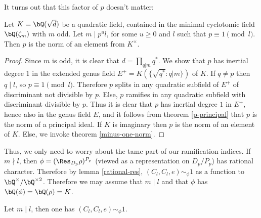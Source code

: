 It turns out that this factor of $p$ doesn't matter:

\begin{lemma}
    Let $K = \bQ(\sqrt{d})$ be a quadratic field, contained in the minimal cyclotomic field $\bQ(\zeta_m)$ with $m$ odd. Let $m \mid p^u l $, for some $u \geq 0$ and $l$ such that $p \equiv 1 \pmod l$. Then $p$ is the norm of an element from $K^{\times}$.
\end{lemma}

\begin{proof}
    Since $m$ is odd, it is clear that $d = \prod_{q | m} q^*$. We show that $p$ has inertial degree $1$ in the extended genus field $E^{+} = K(\{\sqrt{q^*} \colon q | m \})$ of $K$.
    If $q \not= p$ then $q \mid l$, so $p \equiv 1 \pmod l$. Therefore $p$ splits in any quadratic subfield of $E^{+}$ of discriminant not divisible by $p$. Else, $p$ ramifies in any quadratic subfield with discriminant divisible by $p$. Thus it is clear that $p$ has inertial degree $1$ in $E^{+}$, hence also in the genus field $E$, and it follows from theorem \ref{p-principal} that $p$ is the norm of a principal ideal. If $K$ is imaginary then $p$ is the norm of an element of $K$. Else, we invoke theorem \ref{minus-one-norm}.
\end{proof}

Thus, we only need to worry about the tame part of our ramification indices. If $m \nmid l$, then $\phi = (\Res_{D_p} \rho)^{P_p}$ (viewed as a representation on $D_p / P_p$) has rational character. Therefore by lemma \ref{rational-res}, $(C_l, C_l, e) \sim_{\phi} 1$ as a function to $\bQ^{\times} / \bQ^{\times 2}$.
Therefore we may assume that $m \mid l$ and that $\phi$ has $\bQ(\phi) = \bQ(\rho) = K$.

\begin{prop}
    Let $m \mid l$, then one has $(C_l, C_l, e) \sim_{\phi} 1$.   
\end{prop}

